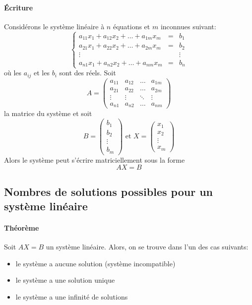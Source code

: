 \paragraph{Écriture} Considérons le système linéaire à $n$ équations et $m$ inconnues suivant:
$$\left\{ \begin{array}{rcl}
  a_{1 1} x_{1} + a_{1 2} x_2 + \ldots + a_{1 m} x_m & = & b_1 \\
  a_{2 1} x_{1} + a_{2 2} x_2 + \ldots + a_{2 m} x_m & = & b_2 \\
  \vdots & & \vdots \\
  a_{n 1} x_{1} + a_{n 2} x_2 + \ldots + a_{n m} x_m & = & b_n
\end{array} \right.$$
où les $a_{i j}$ et les $b_{i}$ sont des réels. Soit
$$A = \begin{pmatrix}
  a_{1 1} & a_{1 2} & \dots & a_{1 m} \\
  a_{2 1} & a_{2 2} & \dots & a_{2 m} \\
  \vdots & \vdots & \ddots & \vdots \\
  a_{n 1} & a_{n 2} & \dots & a_{n m}
\end{pmatrix}$$
la matrice du système et soit
$$B = \begin{pmatrix} b_1 \\ b_2 \\ \vdots \\ b_m \end{pmatrix} \text{ et } 
  X = \begin{pmatrix} x_1 \\ x_2 \\ \vdots \\ x_m \end{pmatrix}$$
Alors le système peut s'écrire matriciellement sous la forme
$$A X = B$$

%
\subsection{Nombres de solutions possibles pour un système linéaire}
%
\paragraph{Théorème} Soit $A X = B$ un système linéaire. Alors, on se trouve dans l'un des cas suivants:
\begin{itemize}
  \item le système a aucune solution (système incompatible) 
  \item le système a une solution unique
  \item le système a une infinité de solutions
\end{itemize}

